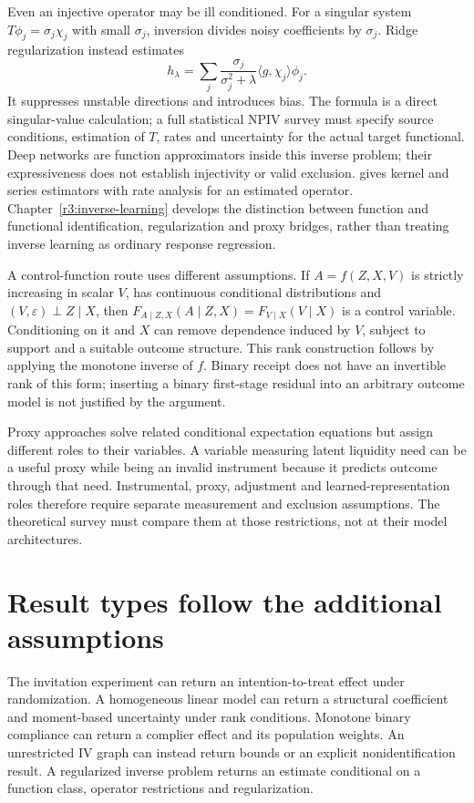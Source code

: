 Even an injective operator may be ill conditioned. For a singular system
$T\phi_j=\sigma_j\chi_j$ with small $\sigma_j$, inversion divides noisy
coefficients by $\sigma_j$. Ridge regularization instead estimates
\[
 h_\lambda=\sum_j\frac{\sigma_j}{\sigma_j^2+\lambda}
              \langle g,\chi_j\rangle\phi_j.
\]
It suppresses unstable directions and introduces bias. The formula is a
direct singular-value calculation; a full statistical NPIV survey must
specify source conditions, estimation of $T$, rates and uncertainty for
the actual target functional. Deep networks are function approximators
inside this inverse problem; their expressiveness does not establish
injectivity or valid exclusion.
\citet[Sections 2 and 4]{hall2005} gives kernel and series estimators
with rate analysis for an estimated operator. Chapter~\ref{r3:inverse-learning}
develops the distinction between function and functional identification,
regularization and proxy bridges, rather than treating inverse learning
as ordinary response regression.

A control-function route uses different assumptions. If
$A=f(Z,X,V)$ is strictly increasing in scalar $V$, has continuous
conditional distributions and $(V,\varepsilon)\perp Z\mid X$, then
$F_{A\mid Z,X}(A\mid Z,X)=F_{V\mid X}(V\mid X)$ is a control variable.
Conditioning on it and $X$ can remove dependence induced by $V$, subject
to support and a suitable outcome structure. This rank construction
follows by applying the monotone inverse of $f$. Binary receipt does not
have an invertible rank of this form; inserting a binary first-stage
residual into an arbitrary outcome model is not justified by the argument.

Proxy approaches solve related conditional expectation equations but
assign different roles to their variables. A variable measuring latent
liquidity need can be a useful proxy while being an invalid instrument
because it predicts outcome through that need. Instrumental, proxy,
adjustment and learned-representation roles therefore require separate
measurement and exclusion assumptions. The theoretical survey must
compare them at those restrictions, not at their model architectures.

\section{Result types follow the additional assumptions}
\label{r3:iv-contract}
The invitation experiment can return an intention-to-treat effect under
randomization. A homogeneous linear model can return a structural
coefficient and moment-based uncertainty under rank conditions. Monotone
binary compliance can return a complier effect and its population weights.
An unrestricted IV graph can instead return bounds or an explicit
nonidentification result. A regularized inverse problem returns an estimate
conditional on a function class, operator restrictions and regularization.

